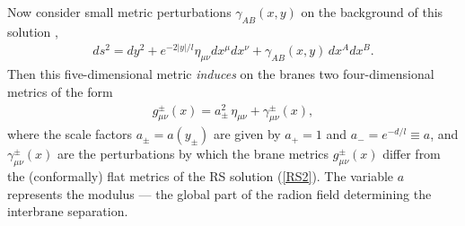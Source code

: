 \documentclass[a4paper,prl,twocolumn,amsmath,amssymb,showpacs]{revtex4}
\begin{document}
Now consider small metric perturbations $\gamma_{AB}(x,y)$ on the  
background of this solution \cite{RS2,GT,GKRChGR}, 
     \begin{eqnarray} 
     ds^2=dy^2+e^{-2|y|/l}\eta_{\mu\nu}dx^\mu dx^\nu 
     +\gamma_{AB}(x,y)\,dx^Adx^B.                   \label{metric} 
     \end{eqnarray} 
Then this five-dimensional metric {\em induces} on the branes two 
four-dimensional metrics of the form 
    \begin{eqnarray} 
    g^\pm_{\mu\nu}(x)= 
    a^2_\pm\,\eta_{\mu\nu}+\gamma^\pm_{\mu\nu}(x),  \label{metric1} 
    \end{eqnarray} 
where the scale factors $a_\pm=a(y_\pm)$ are given by 
    $a_+=1$ and  
$a_-=e^{-d/l}\equiv a$,  
and $\gamma^\pm_{\mu\nu}(x)$ are the perturbations by which the brane 
metrics $g^\pm_{\mu\nu}(x)$ differ from the (conformally) flat 
metrics of the RS solution (\ref{RS2}). The variable $a$ represents 
the modulus --- the global part of the radion field determining the 
interbrane separation. 
 
\end{document}
